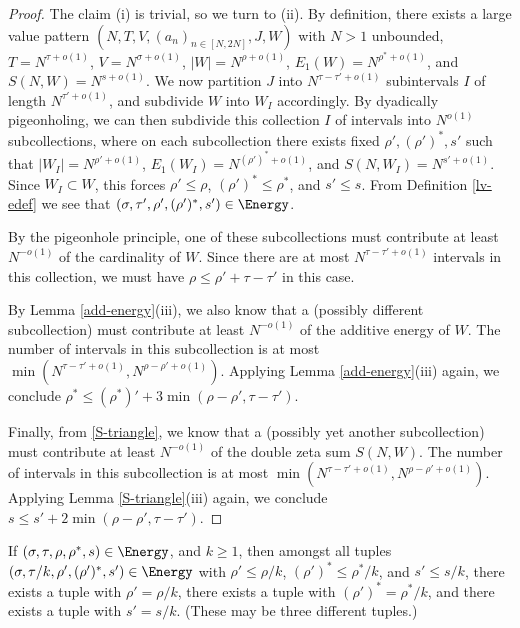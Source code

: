 \begin{proof}  The claim (i) is trivial, so we turn to (ii).  By definition, there exists a large value pattern $(N,T,V,(a_n)_{n \in [N,2N]},J,W)$ with $N > 1$ unbounded, $T = N^{\tau+o(1)}$, $V = N^{\sigma+o(1)}$, $|W| = N^{\rho+o(1)}$, $E_1(W) = N^{\rho^*+o(1)}$, and $S(N,W) = N^{s+o(1)}$.  We now partition $J$ into $N^{\tau-\tau'+o(1)}$ subintervals $I$ of length $N^{\tau'+o(1)}$, and subdivide $W$ into $W_I$ accordingly.  By dyadically pigeonholing, we can then subdivide this collection $I$ of intervals into $N^{o(1)}$ subcollections, where on each subcollection there exists fixed $\rho', (\rho')^*, s'$ such that $|W_I| = N^{\rho'+o(1)}$, $E_1(W_I) = N^{(\rho')^* + o(1)}$, and $S(N,W_I) = N^{s'+o(1)}$.  Since $W_I \subset W$, this forces $\rho' \leq \rho$, $(\rho')^* \leq \rho^*$, and $s' \leq s$.  From Definition \ref{lv-edef} we see that $(\sigma,\tau', \rho', (\rho')^*,s') \in \Energy$.

By the pigeonhole principle, one of these subcollections must contribute at least $N^{-o(1)}$ of the cardinality of $W$.  Since there are at most $N^{\tau-\tau'+o(1)}$ intervals in this collection, we must have $\rho \leq \rho' + \tau - \tau'$ in this case.

By Lemma \ref{add-energy}(iii), we also know that a (possibly different subcollection) must contribute at least $N^{-o(1)}$ of the additive energy of $W$.  The number of intervals in this subcollection is at most $\min( N^{\tau-\tau'+o(1)}, N^{\rho-\rho'+o(1)})$.  Applying Lemma \ref{add-energy}(iii) again, we conclude $\rho^* \leq (\rho^*)' + 3\min(\rho-\rho',\tau-\tau')$.

Finally, from \eqref{S-triangle}, we know that a (possibly yet another subcollection) must contribute at least $N^{-o(1)}$ of the double zeta sum $S(N,W)$. The number of intervals in this subcollection is at most $\min( N^{\tau-\tau'+o(1)}, N^{\rho-\rho'+o(1)})$.  Applying Lemma \ref{S-triangle}(iii) again, we conclude $s \leq s' + 2\min(\rho-\rho',\tau-\tau')$.
\end{proof}


\begin{lemma}\label{power-energy}  If $(\sigma,\tau,\rho,\rho^*,s) \in \Energy$, and $k \geq 1$, then amongst all tuples $(\sigma,\tau/k,\rho',(\rho')^*,s') \in \Energy$ with $\rho' \leq \rho/k$, $(\rho')^* \leq \rho^*/k$, and $s' \leq s/k$, there exists a tuple with $\rho' = \rho/k$, there exists a tuple with $(\rho')^* = \rho^*/k$, and there exists a tuple with $s' = s/k$. (These may be three different tuples.)
\end{lemma}

